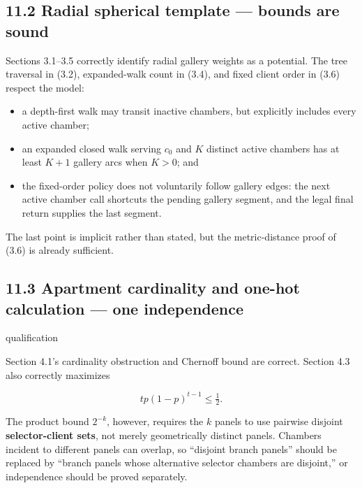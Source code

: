 \documentclass[11pt,a4paper]{article}
\begin{document}
\subsection*{11.2 Radial spherical template — bounds are sound}

Sections 3.1–3.5 correctly identify radial gallery weights as a potential. The tree traversal in (3.2), expanded-walk count in (3.4), and fixed client order in (3.6) respect the model:


\begin{itemize}

\item a depth-first walk may transit inactive chambers, but explicitly includes every active chamber;

\item an expanded closed walk serving \(c_0\) and \(K\) distinct active chambers has at least \(K+1\) gallery arcs when \(K>0\); and

\item the fixed-order policy does not voluntarily follow gallery edges: the next active chamber call shortcuts the pending gallery segment, and the legal final return supplies the last segment.

\end{itemize}

The last point is implicit rather than stated, but the metric-distance proof of (3.6) is already sufficient.


\subsection*{11.3 Apartment cardinality and one-hot calculation — one independence}

qualification


Section 4.1's cardinality obstruction and Chernoff bound are correct.  Section 4.3 also correctly maximizes


\[
t p(1-p)^{t-1}\le\tfrac12.
\]

The product bound \(2^{-k}\), however, requires the \(k\) panels to use pairwise disjoint \textbf{selector-client sets}, not merely geometrically distinct panels.  Chambers incident to different panels can overlap, so “disjoint branch panels” should be replaced by “branch panels whose alternative selector chambers are disjoint,” or independence should be proved separately.
\end{document}
